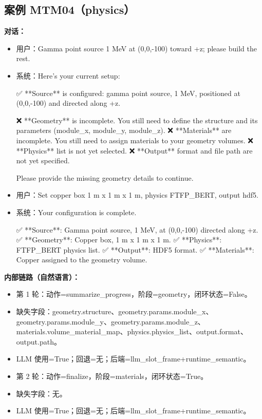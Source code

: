 \documentclass[11pt]{ctexart}
\begin{document}
\subsection{案例 MTM04（physics）}
\textbf{对话：}
\begin{itemize}
\item 用户：Gamma point source 1 MeV at (0,0,-100) toward +z; please build the rest.
\item 系统：Here's your current setup:

✅ **Source** is configured: gamma point source, 1 MeV, positioned at (0,0,-100) and directed along +z.

❌ **Geometry** is incomplete. You still need to define the structure and its parameters (module\_x, module\_y, module\_z).
❌ **Materials** are incomplete. You still need to assign materials to your geometry volumes.
❌ **Physics** list is not yet selected.
❌ **Output** format and file path are not yet specified.

Please provide the missing geometry details to continue.
\item 用户：Set copper box 1 m x 1 m x 1 m, physics FTFP\_BERT, output hdf5.
\item 系统：Your configuration is complete.

✅ **Source**: Gamma point source, 1 MeV, at (0,0,-100) directed along +z.
✅ **Geometry**: Copper box, 1 m x 1 m x 1 m.
✅ **Physics**: FTFP\_BERT physics list.
✅ **Output**: HDF5 format.
✅ **Materials**: Copper assigned to the geometry volume.
\end{itemize}
\textbf{内部链路（自然语言）：}
\begin{itemize}
\item 第 1 轮：动作=summarize\_progress，阶段=geometry，闭环状态=False。
\item 缺失字段：geometry.structure、geometry.params.module\_x、geometry.params.module\_y、geometry.params.module\_z、materials.volume\_material\_map、physics.physics\_list、output.format、output.path。
\item LLM 使用=True；回退=无；后端=llm\_slot\_frame+runtime\_semantic。
\item 第 2 轮：动作=finalize，阶段=materials，闭环状态=True。
\item 缺失字段：无。
\item LLM 使用=True；回退=无；后端=llm\_slot\_frame+runtime\_semantic。
\end{itemize}
\end{document}
